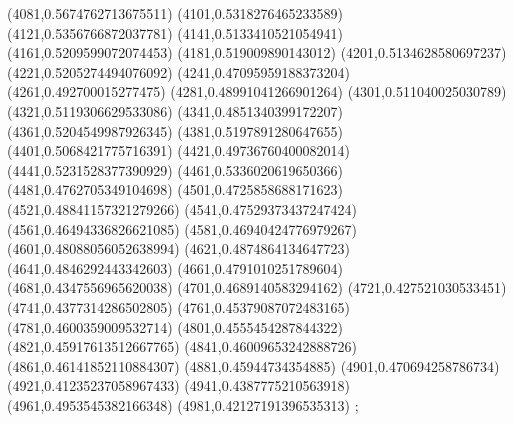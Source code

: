 {(4081,0.5674762713675511)
(4101,0.5318276465233589)
(4121,0.5356766872037781)
(4141,0.5133410521054941)
(4161,0.5209599072074453)
(4181,0.519009890143012)
(4201,0.5134628580697237)
(4221,0.5205274494076092)
(4241,0.47095959188373204)
(4261,0.492700015277475)
(4281,0.48991041266901264)
(4301,0.511040025030789)
(4321,0.5119306629533086)
(4341,0.4851340399172207)
(4361,0.5204549987926345)
(4381,0.5197891280647655)
(4401,0.5068421775716391)
(4421,0.49736760400082014)
(4441,0.5231528377390929)
(4461,0.5336020619650366)
(4481,0.4762705349104698)
(4501,0.4725858688171623)
(4521,0.48841157321279266)
(4541,0.47529373437247424)
(4561,0.46494336826621085)
(4581,0.46940424776979267)
(4601,0.48088056052638994)
(4621,0.4874864134647723)
(4641,0.4846292443342603)
(4661,0.4791010251789604)
(4681,0.4347556965620038)
(4701,0.4689140583294162)
(4721,0.427521030533451)
(4741,0.4377314286502805)
(4761,0.45379087072483165)
(4781,0.4600359009532714)
(4801,0.4555454287844322)
(4821,0.45917613512667765)
(4841,0.46009653242888726)
(4861,0.46141852110884307)
(4881,0.45944734354885)
(4901,0.470694258786734)
(4921,0.41235237058967433)
(4941,0.4387775210563918)
(4961,0.4953545382166348)
(4981,0.42127191396535313)
};
